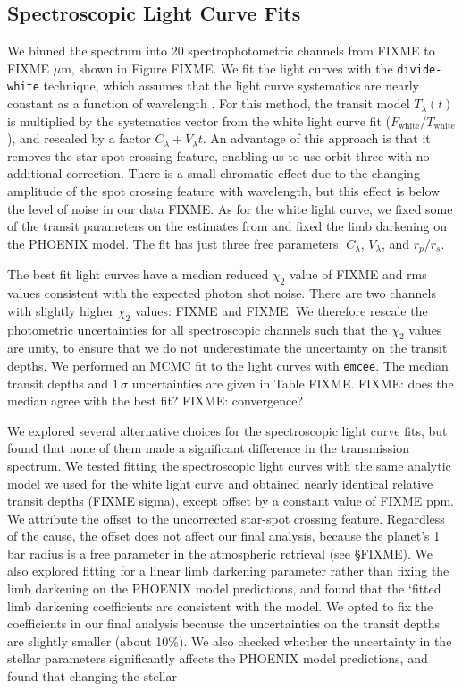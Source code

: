 \documentclass[twocolumn]{aastex61}
\begin{document}
\subsection{Spectroscopic Light Curve Fits}
We binned the spectrum into 20 spectrophotometric channels from FIXME to FIXME $\mu$m, shown in Figure FIXME. We fit the light curves with the \texttt{divide-white} technique, which assumes that the light curve systematics are nearly constant as a function of wavelength \citep{stevenson??, kreidberg14a}. For this method, the transit model $T_\lambda(t)$ is multiplied by the systematics vector from the white light curve fit ($F_\mathrm{white}/T_\mathrm{white}$), and rescaled by a factor $C_\lambda + V_\lambda t$.  An advantage of this approach is that it removes the star spot crossing feature, enabling us to use orbit three with no additional correction. There is a small chromatic effect due to the changing amplitude of the spot crossing feature with wavelength, but this effect is below the level of noise in our data FIXME.  As for the white light curve, we fixed some of the transit parameters on the estimates from \cite{dai17} and fixed the limb darkening on the PHOENIX model. The fit has just three free parameters: $C_\lambda$, $V_\lambda$, and $r_p/r_s$.  

The best fit light curves have a median reduced $\chi_2$ value of FIXME and rms values consistent with the expected photon shot noise.  There are two channels with slightly higher $\chi_2$ values: FIXME and FIXME. We therefore rescale the photometric uncertainties for all spectroscopic channels such that the $\chi_2$ values are unity, to ensure that we do not underestimate the uncertainty on the transit depths. We performed an MCMC fit to the light curves with \texttt{emcee}. The median transit depths and $1\,\sigma$ uncertainties are given in Table FIXME. FIXME: does the  median agree with the best fit? FIXME: convergence?

We explored several alternative choices for the spectroscopic light curve fits, but found that none of them made a significant difference in the transmission spectrum. We tested fitting the spectroscopic light curves with the same analytic model we used for the white light curve and obtained nearly identical relative transit depths (FIXME sigma), except offset by a constant value of FIXME ppm. We attribute the offset to the uncorrected star-spot crossing feature. Regardless of the cause, the offset does not affect our final analysis, because the planet's 1 bar radius is a free parameter in the atmospheric retrieval (see \S FIXME). We also explored fitting for a linear limb darkening parameter rather than fixing the limb darkening on the PHOENIX model predictions, and found that the `fitted limb darkening coefficients are consistent with the model.  We opted to fix the coefficients in our final analysis because the uncertainties on the transit depths are slightly smaller (about 10\%). We also checked whether the uncertainty in the stellar parameters significantly affects the PHOENIX model predictions, and found that changing the stellar 
\end{document}
